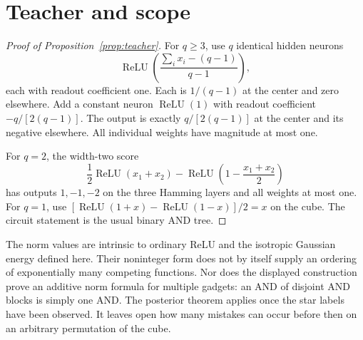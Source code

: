 \documentclass[11pt]{article}
\newcommand{\relu}{\operatorname{ReLU}}
\begin{document}
\section{Teacher and scope}

\begin{proof}[Proof of Proposition~\ref{prop:teacher}]
For $q\ge3$, use $q$ identical hidden neurons
\[
 \relu\!\left(\frac{\sum_i x_i-(q-1)}{q-1}\right),
\]
each with readout coefficient one. Each is $1/(q-1)$ at the
center and zero elsewhere. Add a constant neuron $\relu(1)$
with readout coefficient $-q/[2(q-1)]$. The output is exactly
$q/[2(q-1)]$ at the center and its negative elsewhere. All
individual weights have magnitude at most one.

For $q=2$, the width-two score
\[
 \frac12\relu(x_1+x_2)-\relu\!\left(1-\frac{x_1+x_2}{2}\right)
\]
has outputs $1,-1,-2$ on the three Hamming layers and all weights
at most one. For $q=1$, use
$[\relu(1+x)-\relu(1-x)]/2=x$ on the cube.
The circuit statement is the usual binary AND tree.
\end{proof}

The norm values are intrinsic to ordinary ReLU and the isotropic
Gaussian energy defined here. Their noninteger form does not by
itself supply an ordering of exponentially many competing
functions. Nor does the displayed construction prove an additive
norm formula for multiple gadgets: an AND of disjoint AND blocks
is simply one AND. The posterior theorem applies once the star
labels have been observed. It leaves open how many mistakes can
occur before then on an arbitrary permutation of the cube.
\end{document}
